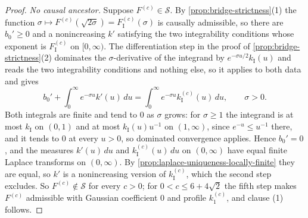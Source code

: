 \begin{proof}
\emph{No causal ancestor.} Suppose $F^{(c)} \in \mathcal{S}$. By \ref{prop:bridge-strictness}(1)
the function $\sigma \mapsto F^{(c)}(\sqrt{2\sigma}) = F^{(c)}_{\mathrm I}(\sigma)$ is causally
admissible, so there are $b_0' \ge 0$ and a nonincreasing $k'$ satisfying the two integrability
conditions whose exponent is $F^{(c)}_{\mathrm I}$ on $[0,\infty)$. The differentiation step in the
proof of \ref{prop:bridge-strictness}(2) dominates the $\sigma$-derivative of the integrand by
$e^{-\sigma u/2}k_{\mathrm I}(u)$ and reads the two integrability conditions and nothing else, so
it applies to both data and gives
\[
  b_0' + \int_0^\infty e^{-\sigma u}k'(u)\,du
   = \int_0^\infty e^{-\sigma u}k^{(c)}_{\mathrm I}(u)\,du , \qquad \sigma > 0 .
\]
Both integrals are finite and tend to $0$ as $\sigma$ grows: for $\sigma \ge 1$ the integrand is
at most $k_{\mathrm I}$ on $(0,1)$ and at most $k_{\mathrm I}(u)u^{-1}$ on $(1,\infty)$, since
$e^{-u} \le u^{-1}$ there, and it tends to $0$ at every $u > 0$, so dominated convergence applies.
Hence $b_0' = 0$, and the measures $k'(u)\,du$ and $k^{(c)}_{\mathrm I}(u)\,du$ on $(0,\infty)$
have equal finite Laplace transforms on $(0,\infty)$. By
\ref{prop:laplace-uniqueness-locally-finite} they are equal, so $k'$ is a nonincreasing version of
$k^{(c)}_{\mathrm I}$, which the second step excludes. So $F^{(c)} \notin \mathcal{S}$ for every
$c > 0$; for $0 < c \le 6+4\sqrt2$ the fifth step makes $F^{(c)}$ admissible with Gaussian
coefficient $0$ and profile $k^{(c)}_1$, and clause (1) follows.


\end{proof}

